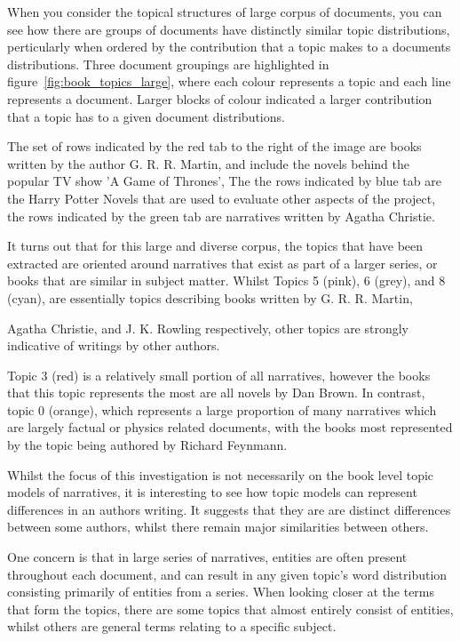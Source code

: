 \documentclass[10pt]{report}
\begin{document}
\begin{multicols}{2}
  \columnbreak
  
  When you consider the topical structures of large corpus of documents, you can see how there are  groups of documents have distinctly similar topic distributions, perticularly when ordered by the contribution that a topic makes to a documents distributions. Three document groupings are highlighted in figure~\ref{fig:book_topics_large}, where each colour represents a topic and each line represents a document. Larger blocks of colour indicated a larger contribution that a topic has to a given document distributions.

  The set of rows indicated by the red tab to the right of the image are books written by the author G. R. R. Martin, and include the novels behind the popular TV show 'A Game of Thrones', The the rows indicated by blue tab are the Harry Potter Novels that are used to evaluate other aspects of the project, the rows indicated by the green tab are narratives written by Agatha Christie.

It turns out that for this large and diverse corpus, the topics that have been extracted are oriented around narratives that exist as part of a larger series, or books that are similar in subject matter. Whilst Topics 5 (pink), 6 (grey), and 8 (cyan), are essentially topics describing books written by G. R. R. Martin, 
\end{multicols}
 Agatha Christie, and J. K. Rowling respectively, other topics are strongly indicative of writings by other authors.

Topic 3 (red) is a relatively small portion of all narratives, however the books that this topic represents the most are all novels by Dan Brown. In contrast, topic 0 (orange), which represents a large proportion of many narratives which are largely factual or physics related documents, with the books most represented by the topic being authored by Richard Feynmann.

Whilst the focus of this investigation is not necessarily on the book level topic models of narratives, it is interesting to see how topic models can represent differences in an authors writing. It suggests that they are are distinct differences between some authors, whilst there remain major similarities between others.

One concern is that in large series of narratives, entities are often present throughout each document,  and can result in any given topic's word distribution consisting primarily of entities from a series. When looking closer at the terms that form the topics, there are some topics that almost entirely consist of entities, whilst others are general terms relating to a specific subject.
\end{document}
